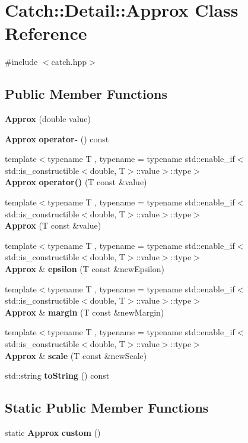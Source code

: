 \section{Catch\+::Detail\+::Approx Class Reference}
\label{class_catch_1_1_detail_1_1_approx}


{\ttfamily \#include $<$catch.\+hpp$>$}

\subsection*{Public Member Functions}
\begin{DoxyCompactItemize}
\item 
\textbf{ Approx} (double value)
\item 
\textbf{ Approx} \textbf{ operator-\/} () const
\item 
{\footnotesize template$<$typename T , typename  = typename std\+::enable\+\_\+if$<$std\+::is\+\_\+constructible$<$double, T$>$\+::value$>$\+::type$>$ }\\\textbf{ Approx} \textbf{ operator()} (T const \&value)
\item 
{\footnotesize template$<$typename T , typename  = typename std\+::enable\+\_\+if$<$std\+::is\+\_\+constructible$<$double, T$>$\+::value$>$\+::type$>$ }\\\textbf{ Approx} (T const \&value)
\item 
{\footnotesize template$<$typename T , typename  = typename std\+::enable\+\_\+if$<$std\+::is\+\_\+constructible$<$double, T$>$\+::value$>$\+::type$>$ }\\\textbf{ Approx} \& \textbf{ epsilon} (T const \&new\+Epsilon)
\item 
{\footnotesize template$<$typename T , typename  = typename std\+::enable\+\_\+if$<$std\+::is\+\_\+constructible$<$double, T$>$\+::value$>$\+::type$>$ }\\\textbf{ Approx} \& \textbf{ margin} (T const \&new\+Margin)
\item 
{\footnotesize template$<$typename T , typename  = typename std\+::enable\+\_\+if$<$std\+::is\+\_\+constructible$<$double, T$>$\+::value$>$\+::type$>$ }\\\textbf{ Approx} \& \textbf{ scale} (T const \&new\+Scale)
\item 
std\+::string \textbf{ to\+String} () const
\end{DoxyCompactItemize}
\subsection*{Static Public Member Functions}
\begin{DoxyCompactItemize}
\item 
static \textbf{ Approx} \textbf{ custom} ()
\end{DoxyCompactItemize}
